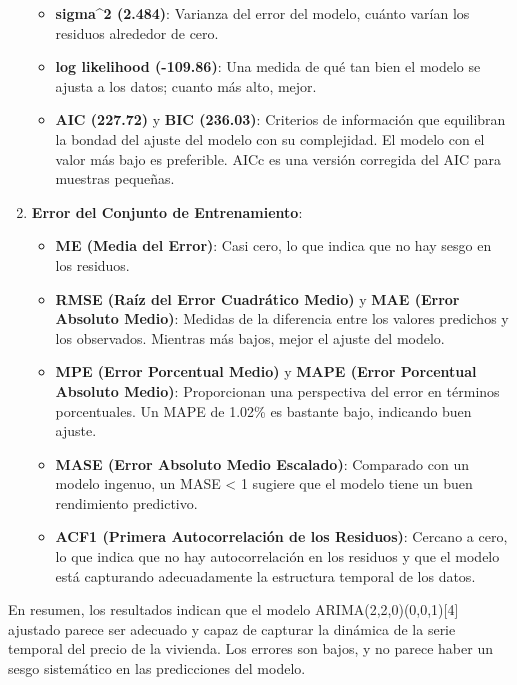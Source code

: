 \documentclass[
]{article}
\begin{document}
\begin{enumerate}
  \begin{itemize}
  \item
    \textbf{sigma\^{}2 (2.484)}: Varianza del error del modelo, cuánto
    varían los residuos alrededor de cero.
  \item
    \textbf{log likelihood (-109.86)}: Una medida de qué tan bien el
    modelo se ajusta a los datos; cuanto más alto, mejor.
  \item
    \textbf{AIC (227.72)} y \textbf{BIC (236.03)}: Criterios de
    información que equilibran la bondad del ajuste del modelo con su
    complejidad. El modelo con el valor más bajo es preferible. AICc es
    una versión corregida del AIC para muestras pequeñas.
  \end{itemize}
\item
  \textbf{Error del Conjunto de Entrenamiento}:

  \begin{itemize}
  \item
    \textbf{ME (Media del Error)}: Casi cero, lo que indica que no hay
    sesgo en los residuos.
  \item
    \textbf{RMSE (Raíz del Error Cuadrático Medio)} y \textbf{MAE (Error
    Absoluto Medio)}: Medidas de la diferencia entre los valores
    predichos y los observados. Mientras más bajos, mejor el ajuste del
    modelo.
  \item
    \textbf{MPE (Error Porcentual Medio)} y \textbf{MAPE (Error
    Porcentual Absoluto Medio)}: Proporcionan una perspectiva del error
    en términos porcentuales. Un MAPE de 1.02\% es bastante bajo,
    indicando buen ajuste.
  \item
    \textbf{MASE (Error Absoluto Medio Escalado)}: Comparado con un
    modelo ingenuo, un MASE \textless{} 1 sugiere que el modelo tiene un
    buen rendimiento predictivo.
  \item
    \textbf{ACF1 (Primera Autocorrelación de los Residuos)}: Cercano a
    cero, lo que indica que no hay autocorrelación en los residuos y que
    el modelo está capturando adecuadamente la estructura temporal de
    los datos.
  \end{itemize}
\end{enumerate}

En resumen, los resultados indican que el modelo
ARIMA(2,2,0)(0,0,1){[}4{]} ajustado parece ser adecuado y capaz de
capturar la dinámica de la serie temporal del precio de la vivienda. Los
errores son bajos, y no parece haber un sesgo sistemático en las
predicciones del modelo.
\end{document}
